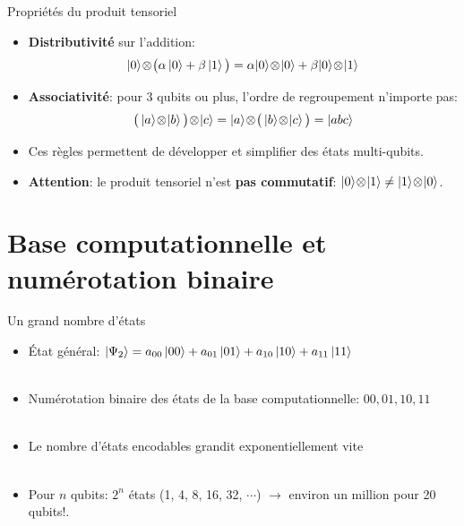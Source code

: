 \documentclass[aspectratio=169,12pt]{beamer}
\begin{document}
\begin{frame}{Propriétés du produit tensoriel}
  \begin{itemize}[<+->]
    \setlength{\itemsep}{0.6em}
    \item \textbf{Distributivité} sur l'addition:
    $$\ket{0}\!\otimes\!\big(\alpha\ket{0}+\beta\ket{1}\big)
      = \alpha\!\ket{0}\!\otimes\!\ket{0}+\beta\!\ket{0}\!\otimes\!\ket{1}$$
    \item \textbf{Associativité}: pour 3 qubits ou plus, l'ordre de regroupement n'importe pas:
    $$\big(\ket{a}\!\otimes\!\ket{b}\big)\!\otimes\!\ket{c}
      = \ket{a}\!\otimes\!\big(\ket{b}\!\otimes\!\ket{c}\big)
      = \ket{abc}$$
    \item Ces règles permettent de développer et simplifier des états multi-qubits.
    \item \textbf{Attention}: le produit tensoriel n'est \textbf{pas commutatif}:
     $\ket{0}\!\otimes\!\ket{1} \neq \ket{1}\!\otimes\!\ket{0}$.
  \end{itemize}
\end{frame}

\section{Base computationnelle et numérotation binaire}

\begin{frame}{Un grand nombre d'états}
  \begin{itemize}
    \item État général: $\ket{\Psi_2} = a_{00}\ket{00}+a_{01}\ket{01}+a_{10}\ket{10}+a_{11}\ket{11}$
    \\~\\
    \item Numérotation binaire des états de la base computationnelle: $00, 01, 10, 11$
    \\~\\
    \item Le nombre d'états encodables grandit exponentiellement vite
    \\~\\
    \item Pour $n$ qubits: $2^n$ états (1, 4, 8, 16, 32, $\cdots$) $\rightarrow$ environ un million pour 20 qubits!.
  \end{itemize}
\end{frame}
\end{document}
